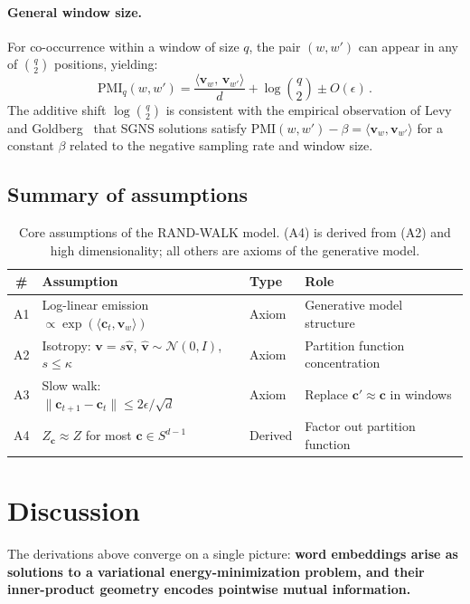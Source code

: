 \documentclass[11pt]{article}
\newcommand{\vw}{\bm{v}}
\newcommand{\PMI}{\mathrm{PMI}}
\begin{document}
\paragraph{General window size.} For co-occurrence within a window of size $q$, the pair $(w, w')$ can appear in any of $\binom{q}{2}$ positions, yielding:
\begin{equation}\label{eq:rw-window}
    \PMI_q(w, w') = \frac{\langle \vw_w,\, \vw_{w'} \rangle}{d} + \log \binom{q}{2} \pm O(\epsilon)\,.
\end{equation}
The additive shift $\log \binom{q}{2}$ is consistent with the empirical observation of Levy and Goldberg~\cite{levy2014} that SGNS solutions satisfy $\PMI(w, w') - \beta = \langle \vw_w, \vw_{w'} \rangle$ for a constant $\beta$ related to the negative sampling rate and window size.

\subsection{Summary of assumptions}

\begin{table}[h]
\centering
\begin{tabular}{@{}clll@{}}
\toprule
\textbf{\#} & \textbf{Assumption} & \textbf{Type} & \textbf{Role} \\
\midrule
A1 & Log-linear emission $\propto \exp(\langle \bm{c}_t, \vw_w \rangle)$ & Axiom & Generative model structure \\
A2 & Isotropy: $\vw = s\hat{\vw}$, $\hat{\vw} \sim \mathcal{N}(0,I)$, $s \leq \kappa$ & Axiom & Partition function concentration \\
A3 & Slow walk: $\|\bm{c}_{t+1} - \bm{c}_t\| \leq 2\epsilon/\sqrt{d}$ & Axiom & Replace $\bm{c}' \approx \bm{c}$ in windows \\
A4 & $Z_{\bm{c}} \approx Z$ for most $\bm{c} \in S^{d-1}$ & Derived & Factor out partition function \\
\bottomrule
\end{tabular}
\caption{Core assumptions of the RAND-WALK model. (A4) is derived from (A2) and high dimensionality; all others are axioms of the generative model.}
\label{tab:assumptions}
\end{table}

\section{Discussion}\label{sec:discussion}

The derivations above converge on a single picture: \textbf{word embeddings arise as solutions to a variational energy-minimization problem, and their inner-product geometry encodes pointwise mutual information.}
\end{document}
